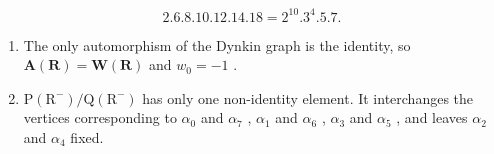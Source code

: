 \[
2. 6. 8. 10. 12. 14. 18 = 2 ^ {10}. 3 ^ {4}. 5. 7.
\]

\begin{enumerate}
\def\labelenumi{(\Roman{enumi})}
\setcounter{enumi}{10}
\item
  The only automorphism of the Dynkin graph is the identity, so \(\mathbf{A}(\mathbf{R}) = \mathbf{W}(\mathbf{R})\) and \(w_0 = -1\) .
\item
  \(\mathrm{P}(\mathrm{R}^{-})/\mathrm{Q}(\mathrm{R}^{-})\) has only one non-identity element. It interchanges the vertices corresponding to \(\alpha_{0}\) and \(\alpha_{7}\) , \(\alpha_{1}\) and \(\alpha_{6}\) , \(\alpha_{3}\) and \(\alpha_{5}\) , and leaves \(\alpha_{2}\) and \(\alpha_{4}\) fixed.
\end{enumerate}

